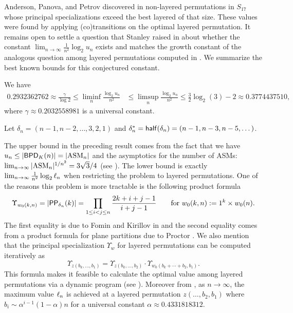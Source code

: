 \documentclass[10pt]{article}
\begin{document}
Anderson, Panova, and Petrov discovered in \cite{AndersonPanovaPetrov}  non-layered permutations in $S_{17}$ whose principal specializations exceed the best layered of that size. These values were found by applying (co)transitions on the optimal layered permutation. It remains open to settle a question that Stanley raised in \cite{StanleyShenanigans} about whether the constant $\lim_{n\to \infty} \frac{1}{n^2}\log_2 u_n$ exists and matches the growth constant of the analogous question among layered permutations computed in \cite{MPP_schub}. We summarize the best known bounds for this conjectured constant.


\begin{proposition} \label{prop: bound PS Schub}
We have  
\begin{align*}
0.2932362762\approx \frac{\gamma}{\log 2} \leq \liminf_n \frac{\log_2 u_n}{n^2} &\leq \limsup_n \frac{\log_2 u_n}{n^2} \leq \frac32 \log_2(3) -2  \approx 0.3774437510,
\end{align*}
where $\gamma\approx 0.2032558981$ is a universal constant.
\end{proposition}

Let $\delta_n = (n-1,n-2,\dots,3,2,1)$ and $\delta^\ast_n = \mathsf{half}(\delta_n) = (n-1,n-3,n-5,\dots)$.
\begin{remark} \label{rem: bds max ps Schubs}
The upper bound in the preceding result comes from the fact that we have 
$u_n \leq |\mathsf{BPD}_K(n)|= |\mathrm{ASM}_n|$
 and the asymptotics for the number of ASMs: $\lim_{n\to \infty} |\mathrm{ASM}_n|^{1/n^2}=3\sqrt{3}/4$ (see \cite[Eq. (11.5)]{BFK}).
The lower bound  is exactly $\lim_{n \to \infty} \frac{1}{n^2}\log_2 \ell_n$ when restricting the problem to layered permutations. One of the reasons this problem is more tractable is the following product formula
    \[
\Upsilon_{w_0(k,n)} = |\mathsf{PP}_{\delta_n}(k)| = \displaystyle\prod_{1\leq i<j\leq n} \frac{2k+i+j-1}{i+j-1}
\qquad\text{for }w_0(k,n):= 1^k\times w_0(n).
\]
The first equality is due to  Fomin and Kirillov in \cite{FominKirillov1997} and the second equality comes from a product formula for plane partitions due to Proctor \cite{Proctor1994}.
We also mention that the principal specialization $\Upsilon_w$ for layered permutations can be computed iteratively \cite[Prop. 2.2]{MPP_schub} as 
\begin{equation} \label{eq: ps layered perm}
{\Upsilon}_{z(b_k,\ldots,b_1)} = {\Upsilon}_{z(b_k,\ldots,b_{2})}\cdot {\Upsilon}_{w_0(b_k+\cdots+b_{2},b_1)}.
\end{equation}
This formula makes it feasible to calculate the optimal value among layered permutations via a dynamic program (see \cite[Appendix]{MPP_schub}). Moreover from \cite[Thm. 1.3]{MPP_schub}, as $n\to \infty$, the maximum value $\ell_n$ is achieved at a layered permutation $z(\ldots,b_2,b_1)$ where $b_i \sim \alpha^{i-1}(1-\alpha)n$ for a universal constant $\alpha\approx 0.4331818312$.
\end{remark}
\end{document}
